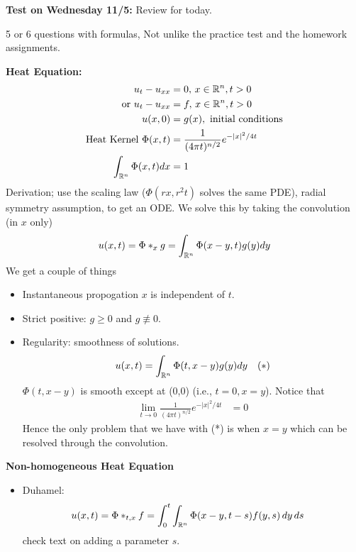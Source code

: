 \documentclass[12pt,a4paper]{report}
\begin{document}
{\begin{description}
	\item \textbf{Test on Wednesday 11/5:} Review for today.
	
	\item 5 or 6 questions with formulas,   Not unlike the practice test and the homework assignments.
	
	\item \textbf{Heat Equation: }
	\begin{align*}
		u_t - u_{xx} &=0, \, x \in \mathbb{R}^n, t>0 \\
		\text{ or }	u_t - u_{xx} &=f, \, x \in \mathbb{R}^n, t>0 \\
		u(x,0) &= g(x), \text{ initial conditions} \\
		\text{Heat Kernel } \Phi(x,t) &= \frac{1}{(4\pi t)^{n/2}} e^{-|x|^2/4t} \\
		\int_{\mathbb{R}^n} \Phi(x,t) dx &= 1\end{align*}Derivation; use the scaling law ($\Phi(rx, r^2t)$ solves the same PDE), radial symmetry assumption, to get an ODE.  We solve this by taking the convolution (in $x$ only) 
		\begin{align*}
			u(x,t) = \Phi *_x g = \int_{\mathbb{R}^n} \Phi(x-y,t)g(y) dy
		\end{align*}We get a couple of things
		\begin{itemize}
			\item Instantaneous propogation $x$ is independent of $t$.
			\item Strict positive: $g \ge 0$ and $g \not \equiv 0$.
			\item Regularity: smoothness of solutions.
			\begin{align*}
				u(x,t) &= \int_{\mathbb{R}^n} \Phi(t, x-y) g(y)dy & (*)
			\end{align*}$\Phi(t, x-y)$ is smooth except at (0,0) (i.e., $t=0, x=y$).  Notice that 
		\begin{align*}
			\lim_{t\to 0} \frac{1}{(4\pi t)^{n/2}} e^{-|x|^2/4t} &= 0
		\end{align*}Hence the only problem that we have with (*) is when $x=y$ which can be resolved through the convolution.
		\end{itemize}
		
	\item \textbf{Non-homogeneous Heat Equation}
	
	\begin{itemize}
		\item Duhamel: 
		\begin{align*}
			u(x,t) &= \Phi *_{t,x} f = \int_0^t\int_{\mathbb{R}^n} \Phi(x-y, t-s) f(y,s)\, dy \, ds
		\end{align*} check text on adding a parameter $s$.
		

\end{itemize}
\end{description}}
\end{document}

